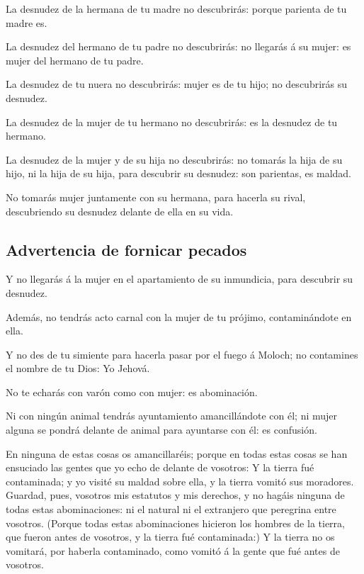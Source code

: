  La desnudez de la hermana de tu madre no descubrirás:
porque parienta de tu madre es.

 La desnudez del hermano de tu padre no descubrirás: no
llegarás á su mujer: es mujer del hermano de tu padre.

 La desnudez de tu nuera no descubrirás: mujer es de tu
hijo; no descubrirás su desnudez.

 La desnudez de la mujer de tu hermano no descubrirás: es
la desnudez de tu hermano.

 La desnudez de la mujer y de su hija no descubrirás: no
tomarás la hija de su hijo, ni la hija de su hija, para descubrir su
desnudez: son parientas, es maldad.

 No tomarás mujer juntamente con su hermana, para hacerla
su rival, descubriendo su desnudez delante de ella en su vida.

\hypertarget{advertencia-de-fornicar-pecados}{%
\subsection{Advertencia de fornicar
pecados}\label{advertencia-de-fornicar-pecados}}

 Y no llegarás á la mujer en el apartamiento de su
inmundicia, para descubrir su desnudez.

 Además, no tendrás acto carnal con la mujer de tu prójimo,
contaminándote en ella.

 Y no des de tu simiente para hacerla pasar por el fuego á
Moloch; no contamines el nombre de tu Dios: Yo Jehová.

 No te echarás con varón como con mujer: es abominación.

 Ni con ningún animal tendrás ayuntamiento amancillándote
con él; ni mujer alguna se pondrá delante de animal para ayuntarse con
él: es confusión.

 En ninguna de estas cosas os amancillaréis; porque en
todas estas cosas se han ensuciado las gentes que yo echo de delante de
vosotros:  Y la tierra fué contaminada; y yo visité su
maldad sobre ella, y la tierra vomitó sus moradores. 
Guardad, pues, vosotros mis estatutos y mis derechos, y no hagáis
ninguna de todas estas abominaciones: ni el natural ni el extranjero que
peregrina entre vosotros.  (Porque todas estas
abominaciones hicieron los hombres de la tierra, que fueron antes de
vosotros, y la tierra fué contaminada:)  Y la tierra no os
vomitará, por haberla contaminado, como vomitó á la gente que fué antes
de vosotros.

